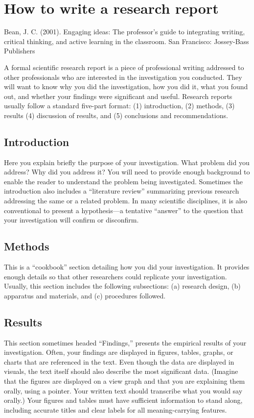 
\section{How to write a research report}

Bean, J. C. (2001). Engaging ideas: The professor’s guide to integrating writing, critical thinking, and active learning in the classroom. San Francisco: Jossey-Bass Publishers

A formal scientific research report is a piece of professional writing addressed to other professionals who are interested in the investigation you conducted. They will want to know why you did the investigation, how you did it, what you found out, and whether your findings were significant and useful. Research reports usually follow a standard five-part format: (1) introduction, (2) methods, (3) results (4) discussion of results, and (5) conclusions and recommendations.

\subsection{Introduction} 
Here you explain briefly the purpose of your investigation. What problem did you address? Why did you address it? You will need to provide enough background to enable the reader to understand the problem being investigated. Sometimes the introduction also includes a “literature review” summarizing previous research addressing the same or a related problem. In many scientific disciplines, it is also conventional to present a hypothesis—a tentative “answer” to the question that your investigation will confirm or disconfirm.

\subsection{Methods} 
This is a “cookbook” section detailing how you did your investigation. It provides enough details so that other researchers could replicate your investigation. Usually, this section includes the following subsections: (a) research design, (b) apparatus and materials, and (c) procedures followed.

\subsection{Results} 
This section sometimes headed “Findings,” presents the empirical results of your investigation. Often, your findings are displayed in figures, tables, graphs, or charts that are referenced in the text. Even though the data are displayed in visuals, the text itself should also describe the most significant data. (Imagine that the figures are displayed on a view graph and that you are explaining them orally, using a pointer. Your written text should transcribe what you would say orally.) Your figures and tables must have sufficient information to stand along, including accurate titles and clear labels for all meaning-carrying features.

